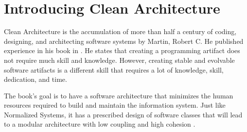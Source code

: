 \section{Introducing Clean Architecture}

Clean Architecture is the accumulation of more than half a century of coding, designing,
and architecting software systems by Martin, Robert C. He published experience in his book
 in \citeyear[]{martin_clean_2018}. He states that
creating a programming artifact does not require much skill and knowledge. However, creating
stable and evolvable software artifacts is a different skill that requires
a lot of knowledge, skill, dedication, and time.

The book's goal is to have a software architecture that minimizes the human resources
required to build and maintain the information system. Just like Normalized Systems, it
has a prescribed design of software classes that will lead to a modular architecture with
low coupling and high cohesion \parencite{martin_clean_2018}.
